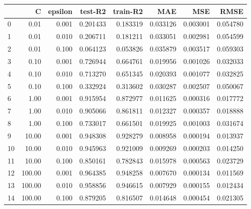 \begin{tabular}{lrrrrrrr}
\toprule
{} &       C &  epsilon &   test-R2 &  train-R2 &       MAE &       MSE &      RMSE \\
\midrule
0  &    0.01 &    0.001 &  0.201433 &  0.183319 &  0.033126 &  0.003001 &  0.054780 \\
1  &    0.01 &    0.010 &  0.206711 &  0.181211 &  0.033051 &  0.002981 &  0.054599 \\
2  &    0.01 &    0.100 &  0.064123 &  0.053826 &  0.035879 &  0.003517 &  0.059303 \\
3  &    0.10 &    0.001 &  0.726944 &  0.664761 &  0.019956 &  0.001026 &  0.032033 \\
4  &    0.10 &    0.010 &  0.713270 &  0.651345 &  0.020393 &  0.001077 &  0.032825 \\
5  &    0.10 &    0.100 &  0.332924 &  0.313602 &  0.030287 &  0.002507 &  0.050067 \\
6  &    1.00 &    0.001 &  0.915954 &  0.872977 &  0.011625 &  0.000316 &  0.017772 \\
7  &    1.00 &    0.010 &  0.905066 &  0.861811 &  0.012327 &  0.000357 &  0.018888 \\
8  &    1.00 &    0.100 &  0.733017 &  0.661501 &  0.019925 &  0.001003 &  0.031674 \\
9  &   10.00 &    0.001 &  0.948308 &  0.928279 &  0.008958 &  0.000194 &  0.013937 \\
10 &   10.00 &    0.010 &  0.945963 &  0.921009 &  0.009269 &  0.000203 &  0.014250 \\
11 &   10.00 &    0.100 &  0.850161 &  0.782843 &  0.015978 &  0.000563 &  0.023729 \\
12 &  100.00 &    0.001 &  0.964385 &  0.948258 &  0.007670 &  0.000134 &  0.011569 \\
13 &  100.00 &    0.010 &  0.958856 &  0.946615 &  0.007929 &  0.000155 &  0.012434 \\
14 &  100.00 &    0.100 &  0.879205 &  0.816507 &  0.014648 &  0.000454 &  0.021305 \\
\bottomrule
\end{tabular}
